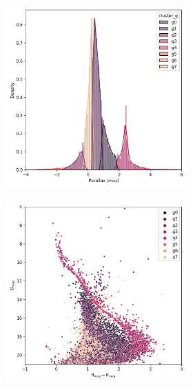 \documentclass[11pt,a4paper,english,twocolumn]{article}
\begin{document}
\begin{figure}[htbp]
\begin{subfigure}{\columnwidth}
\begin{subfigure}[t]{0.30\textwidth}
      \includegraphics[width=\textwidth]{../figures/ngc_2516/dec_parallax_ngc_2516.png}
    \end{subfigure}
    \hfill
    \begin{subfigure}[t]{0.30\textwidth}
      \centering
      \includegraphics[width=\textwidth]{../figures/ngc_2516/dec_hr_diagram_ngc_2516.png}

\end{subfigure}
\end{subfigure}
\end{figure}
\end{document}
